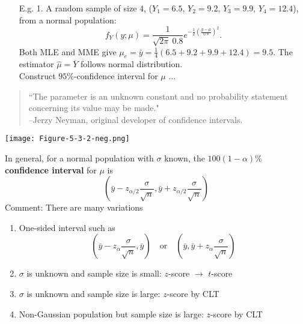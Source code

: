  \begin{frame}
\begin{enumerate}
 \item[E.g. 1.] A random sample of size $4$, ($Y_1 = 6.5$, $Y_2=9.2$, $Y_3=9.9$, $Y_4=12.4$),  from a normal population:
 \[
 f_Y(y;\mu) = \frac{1}{\sqrt{2\pi} \: 0.8} e^{-\frac{1}{2}\left(\frac{y-\mu}{0.8}\right)^2}.
 \]
 Both MLE and MME give $\mu_e = \bar{y} = \frac{1}{4}(6.5+9.2+9.9+12.4)=9.5$.
 The estimator $\widehat\mu=\overline{Y}$ follows normal distribution. \\[3em]
 Construct $95\%$-confidence interval for $\mu$ ...
\end{enumerate}
\end{frame}
\begin{frame}
\begin{quotation}
  ``The parameter is an unknown constant and no probability statement concerning its value may be made." \\[1em]
--Jerzy Neyman, original developer of confidence intervals.
\end{quotation}
 \vfill
 \begin{center}
  \texttt{[image: Figure-5-3-2-neg.png]}
\end{center}
\end{frame}
\begin{frame}
  In general, for a normal population with $\sigma$ known, the {\bf $100(1-\alpha)\%$ confidence interval} for $\mu$ is
  \[
  \left(\bar{y} - z_{\alpha/2}\frac{\sigma}{\sqrt{n}}, \bar{y} + z_{\alpha/2}\frac{\sigma}{\sqrt{n}}\right)
  \]
\vfill
\pause
Comment: There are many variations
\begin{enumerate}
 \item One-sided interval such as
 \[
 \left(\bar{y} - z_{\alpha}\frac{\sigma}{\sqrt{n}}, \bar{y} \right)
 \quad\text{or}\quad
 \left(\bar{y}, \bar{y} + z_{\alpha}\frac{\sigma}{\sqrt{n}}\right)
 \]
 \item $\sigma$ is unknown and sample size is small: \hfill $z$-score $\rightarrow$ $t$-score
 \item $\sigma$ is unknown and sample size is large: \hfill $z$-score by CLT\\[1em]
 \item Non-Gaussian population but sample size is large: \hfill  $z$-score by CLT
\end{enumerate}
\end{frame}
